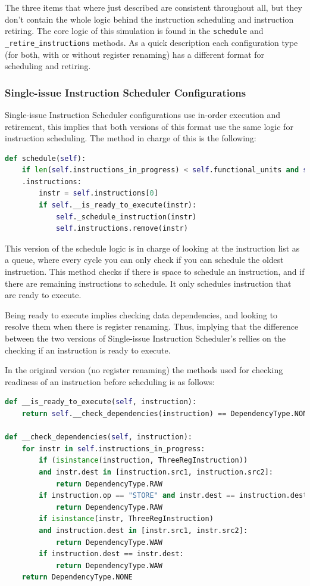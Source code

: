 \documentclass{article}
\begin{document}
The three items that where just described are consistent throughout all, but they don't contain the whole logic behind the instruction scheduling and instruction retiring. The core logic of this simulation is found in the \lstinline|schedule| and \lstinline|_retire_instructions| methods. As a quick description each configuration type (for both, with or without register renaming) has a different format for scheduling and retiring.

\subsubsection{Single-issue Instruction Scheduler Configurations}
Single-issue Instruction Scheduler configurations use in-order execution and retirement, this implies that both versions of this format use the same logic for instruction scheduling. The method in charge of this is the following:

\begin{lstlisting}[language=Python]
def schedule(self):
    if len(self.instructions_in_progress) < self.functional_units and self-
    .instructions:
        instr = self.instructions[0]
        if self.__is_ready_to_execute(instr):
            self._schedule_instruction(instr)
            self.instructions.remove(instr) 
\end{lstlisting}

This version of the schedule logic is in charge of looking at the instruction list as a queue, where every cycle you can only check if you can schedule the oldest instruction. This method checks if there is space to schedule an instruction, and if there are remaining instructions to schedule. It only schedules instruction that are ready to execute. 

Being ready to execute implies checking data dependencies, and looking to resolve them when there is register renaming. Thus, implying that the difference between the two versions of Single-issue Instruction Scheduler's rellies on the checking if an instruction is ready to execute.

In the original version (no register renaming) the methods used for checking readiness of an instruction before scheduling is as follows:

\begin{lstlisting}[language=Python]
def __is_ready_to_execute(self, instruction):
    return self.__check_dependencies(instruction) == DependencyType.NONE
    
def __check_dependencies(self, instruction):
    for instr in self.instructions_in_progress:
        if (isinstance(instruction, ThreeRegInstruction)) 
        and instr.dest in [instruction.src1, instruction.src2]:
            return DependencyType.RAW
        if instruction.op == "STORE" and instr.dest == instruction.dest:
            return DependencyType.RAW
        if isinstance(instr, ThreeRegInstruction) 
        and instruction.dest in [instr.src1, instr.src2]:
            return DependencyType.WAW
        if instruction.dest == instr.dest:
            return DependencyType.WAW
    return DependencyType.NONE
\end{lstlisting}
\end{document}
